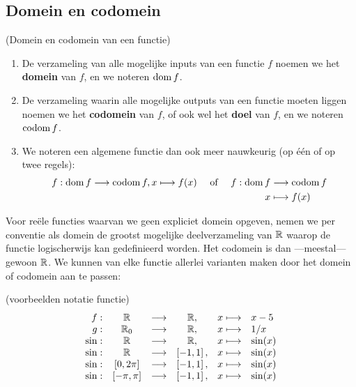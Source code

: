\documentclass{ximera}
\begin{document}
\subsection{Domein en codomein}

 \begin{definition} (Domein en codomein van een functie)
    
    \begin{enumerate}
        \item De verzameling van alle mogelijke inputs van een functie $f$ noemen we het \textbf{domein} van $f$, en we noteren $\mathrm{dom}\, f$.
        \item De verzameling waarin alle mogelijke outputs van een functie moeten liggen noemen we het \textbf{codomein} van $f$, of ook wel het \textbf{doel} van $f$, en we noteren $\mathrm{codom}\, f$.
        \item We noteren een algemene functie dan ook meer nauwkeurig (op één of op twee regels):
        \begin{align*}
        f: \mathrm{dom}\, f \longrightarrow \mathrm{codom}\, f, x \longmapsto f(x) && \text{ of } && f: \mathrm{dom}\, f &\longrightarrow \mathrm{codom}\, f \\
         &&  &&   x &\longmapsto f(x)
        \end{align*}
    \end{enumerate}
\end{definition}

Voor reële functies waarvan we geen expliciet domein opgeven, nemen we per conventie als domein de grootst mogelijke deelverzameling van $\mathbb{R}$ waarop de functie logischerwijs kan gedefinieerd worden. Het codomein is dan ---meestal--- gewoon $\mathbb{R}$.
We kunnen van elke functie allerlei varianten maken door het domein of codomein aan te passen:


\begin{example} (voorbeelden notatie functie)
$$  
\begin{array}{rcccll}    
f:   & \mathbb{R}        &\longrightarrow& \mathbb{R},         &x  \longmapsto & x-5  \\
g:   & \mathbb{R}_0      &\longrightarrow& \mathbb{R},         &x  \longmapsto & 1/x \\
\sin:& \mathbb{R}        &\longrightarrow& \mathbb{R},  &x \longmapsto & \sin(x) \\
\sin:& \mathbb{R}        &\longrightarrow& \left[-1,1\right],  &x \longmapsto & \sin(x) \\
\sin:& [0,2\pi]  &\longrightarrow& \left[-1,1\right],  &x \longmapsto & \sin(x) \\
\sin:& [-\pi,\pi] &\longrightarrow& \left[-1,1\right],  &x \longmapsto & \sin(x) 
\end{array}
$$
\end{example}
\end{document}
